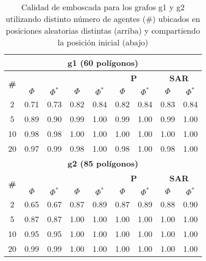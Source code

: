 \begin{table}
	\caption{Calidad de emboscada para los grafos g1 y g2 utilizando distinto
	n\'umero de agentes (\#) ubicados en posiciones aleatorias distintas (arriba) y
	compartiendo la posici\'on inicial (abajo)}
	\label{tab:ambush_g}
	\centering
	\begin{small}
		\setlength{\tabcolsep}{4pt}
		\begin{tabular}{|c|cc|cc|cc|cc|}
			\hline
			\multicolumn{9}{|c|}{\textbf{g1 (60 pol\'igonos)}}\\
			\hline			
			\multirow{2}{*}{\textbf{\#}} &
			\multicolumn{2}{c|}{\textbf{\astar}} &
			\multicolumn{2}{c|}{\textbf{\ambush}} &
			\multicolumn{2}{c|}{\textbf{P}} &
			\multicolumn{2}{c|}{\textbf{SAR}}\\
			& $\Phi$ & $\Phi^*$ & $\Phi$ & $\Phi^*$&
			$\Phi$ & $\Phi^*$& $\Phi$ & $\Phi^*$\\
			\hline
			2  & 0.71 & 0.73 & 0.82 & 0.84 & 0.82 & 0.84 & 0.83 & 0.84\\
			5  & 0.89 & 0.90 & 0.99 & 1.00 & 0.99 & 1.00 & 0.99 & 1.00\\
			10 & 0.98 & 0.98 & 1.00 & 1.00 & 1.00 & 1.00 & 1.00 & 1.00\\
			20 & 0.97 & 0.99 & 0.98 & 1.00 & 0.98 & 1.00 & 0.98 & 1.00\\
			\hline
			\multicolumn{9}{|c|}{\textbf{g2 (85 pol\'igonos)}}\\
			\hline
			\multirow{2}{*}{\textbf{\#}} &
			\multicolumn{2}{c|}{\textbf{\astar}} &
			\multicolumn{2}{c|}{\textbf{\ambush}} &
			\multicolumn{2}{c|}{\textbf{P}} &
			\multicolumn{2}{c|}{\textbf{SAR}}\\
			& $\Phi$ & $\Phi^*$ & $\Phi$ & $\Phi^*$&
			$\Phi$ & $\Phi^*$& $\Phi$ & $\Phi^*$\\
			\hline
			2  & 0.65 & 0.67 & 0.87 & 0.89 & 0.87 & 0.89 & 0.88 & 0.90\\
			5  & 0.87 & 0.87 & 1.00 & 1.00 & 1.00 & 1.00 & 1.00 & 1.00\\
			10 & 0.95 & 0.95 & 1.00 & 1.00 & 1.00 & 1.00 & 1.00 & 1.00\\
			20 & 0.99 & 0.99 & 1.00 & 1.00 & 1.00 & 1.00 & 1.00 & 1.00\\
			\hline
		\end{tabular}
		

\end{small}
\end{table}

